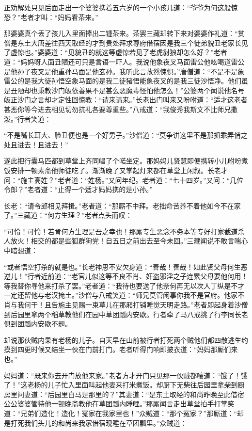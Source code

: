 \documentclass[12pt,UTF8]{ctexbook}
\begin{document}
正劝解处只见后面走出一个婆婆携着五六岁的一个小孩儿道：“爷爷为何这般惊恐？”老者才叫：“妈妈看茶来。”

那婆婆真个丢了孩儿入里面捧出二锺茶来。茶罢三藏却转下来对婆婆作礼道：“贫僧是东土大唐差往西天取经的才到贵处拜求尊府借宿因是我三个徒弟貌丑老家长见了虚惊也。”婆婆道：“见貌丑的就这等虚惊若见了老虎豺狼却怎么好？”老者道：“妈妈呀人面丑陋还可只是言语一吓人。我说他象夜叉马面雷公他吆喝道雷公是他孙子夜叉是他重孙马面是他玄孙。我听此言故然悚惧。”唐僧道：“不是不是象雷公的是我大徒孙悟空象马面的是我二徒猪悟能象夜叉的是我三徒沙悟净。他们虽是丑陋却也秉教沙门皈依善果不是甚么恶魔毒怪怕他怎么！”公婆两个闻说他名号皈正沙门之言却才定性回惊教：“请来请来。”长老出门叫来又吩咐道：“适才这老者甚恶你等今进去相见切勿抗礼各要尊重些。”八戒道：“我俊秀我斯文不比师兄撒泼。”行者笑道：

“不是嘴长耳大、脸丑便也是一个好男子。”沙僧道：“莫争讲这里不是那抓乖弄俏之处且进去！且进去！”

遂此把行囊马匹都到草堂上齐同唱了个喏坐定。那妈妈儿贤慧即便携转小儿咐吩煮饭安排一顿素斋他师徒吃了。渐渐晚了又掌起灯来都在草堂上闲叙。长老才问：“施主高姓？”老者道：“姓杨。”又问年纪。老者道：“七十四岁。”又问：“几位令郎？”老者道：“止得一个适才妈妈携的是小孙。”

长老：“请令郎相见拜揖。”老者道：“那厮不中拜。老拙命苦养不着他如今不在家了。”三藏道：“何方生理？”老者点头而叹：

“可怜！可怜！若肯何方生理是吾之幸也！那厮专生恶念不务本等专好打家截道杀人放火！相交的都是些狐群狗党！自五日之前出去至今未回。”三藏闻说不敢言喘心中暗想道：

“或者悟空打杀的就是也。”长老神思不安欠身道：“善哉！善哉！如此贤父母何生恶逆儿！”行者近前道：“老官儿似这等不良不肖、奸盗邪淫之子连累父母要他何用！等我替你寻他来打杀了罢。”老者道：“我待也要送了他奈何再无以次人丁纵是不才一定还留他与老汉掩土。”沙僧与八戒笑道：“师兄莫管闲事你我不是官府。他家不肖与我何干！且告施主见赐一束草儿在那厢打铺睡觉天明走路。”老者即起身着沙僧到后园里拿两个稻草教他们在园中草团瓢内安歇。行者牵了马八戒挑了行李同长老俱到团瓢内安歇不题。

却说那伙贼内果有老杨的儿子。自天早在山前被行者打死两个贼他们都四散逃生约摸到四更时候又结坐一伙在门前打门。老者听得门响即披衣道：“妈妈那厮们来也。”

妈妈道：“既来你去开门放他来家。”老者方才开门只见那一伙贼都嚷道：“饿了！饿了！”这老杨的儿子忙入里面叫起他妻来打米煮饭。却厨下无柴往后园里拿柴到厨房里问妻道：“后园里白马是那里的？”其妻道：“是东土取经的和尚昨晚至此借宿公公婆婆管待他一顿晚斋教他在草团瓢内睡哩。”那厮闻言走出草堂拍手打掌笑道：“兄弟们造化！造化！冤家在我家里也！”众贼道：“那个冤家？”那厮道：“却是打死我们头儿的和尚来我家借宿现睡在草团瓢里。”众贼道：
\end{document}
